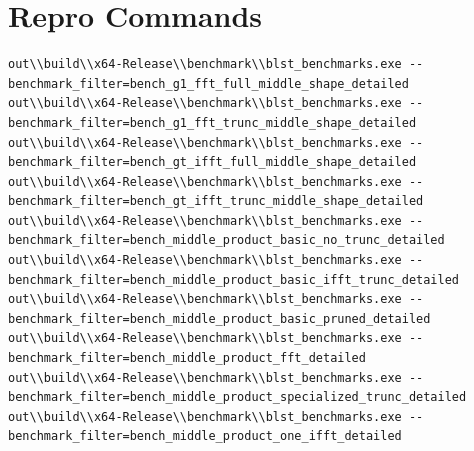 \documentclass[11pt]{article}
\begin{document}
\section{Repro Commands}
\begin{verbatim}
out\\build\\x64-Release\\benchmark\\blst_benchmarks.exe --benchmark_filter=bench_g1_fft_full_middle_shape_detailed
out\\build\\x64-Release\\benchmark\\blst_benchmarks.exe --benchmark_filter=bench_g1_fft_trunc_middle_shape_detailed
out\\build\\x64-Release\\benchmark\\blst_benchmarks.exe --benchmark_filter=bench_gt_ifft_full_middle_shape_detailed
out\\build\\x64-Release\\benchmark\\blst_benchmarks.exe --benchmark_filter=bench_gt_ifft_trunc_middle_shape_detailed
out\\build\\x64-Release\\benchmark\\blst_benchmarks.exe --benchmark_filter=bench_middle_product_basic_no_trunc_detailed
out\\build\\x64-Release\\benchmark\\blst_benchmarks.exe --benchmark_filter=bench_middle_product_basic_ifft_trunc_detailed
out\\build\\x64-Release\\benchmark\\blst_benchmarks.exe --benchmark_filter=bench_middle_product_basic_pruned_detailed
out\\build\\x64-Release\\benchmark\\blst_benchmarks.exe --benchmark_filter=bench_middle_product_fft_detailed
out\\build\\x64-Release\\benchmark\\blst_benchmarks.exe --benchmark_filter=bench_middle_product_specialized_trunc_detailed
out\\build\\x64-Release\\benchmark\\blst_benchmarks.exe --benchmark_filter=bench_middle_product_one_ifft_detailed
\end{verbatim}
\end{document}

